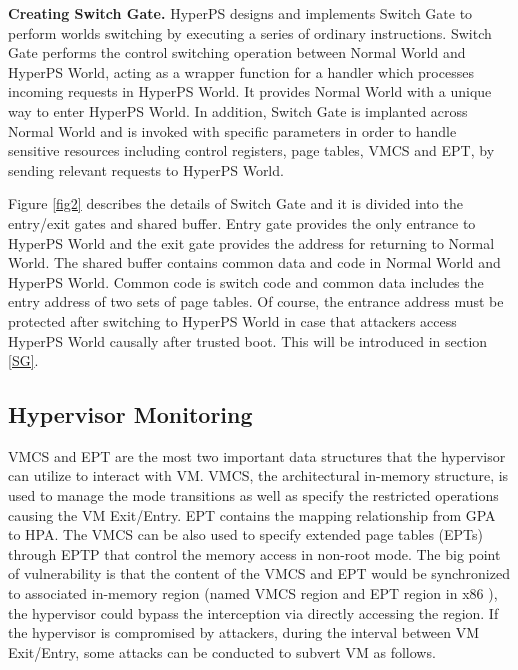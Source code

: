 ﻿\documentclass[conference]{IEEEtran}
\begin{document}
\textbf{Creating Switch Gate.}
HyperPS designs and implements Switch Gate to perform worlds switching by executing a series of ordinary instructions.
Switch Gate performs the control switching operation between Normal World and HyperPS World, acting as a wrapper function for a handler which processes incoming requests in HyperPS World. It provides Normal World with a unique way to enter HyperPS World. In addition, Switch Gate is implanted across Normal World and is invoked with specific parameters in order to handle sensitive resources including control registers, page tables, VMCS and EPT, by sending relevant requests to HyperPS World.

Figure \ref{fig2} describes the details of Switch Gate and it is divided into the entry/exit gates and shared buffer.
Entry gate provides the only entrance to HyperPS World and the exit gate provides the address for returning to Normal World. The shared buffer contains common data and code in Normal World and HyperPS World. Common code is switch code and common data includes the entry address of two sets of page tables.
 Of course, the entrance address must be protected after switching to HyperPS World in case that attackers access HyperPS World causally after trusted boot. This will be introduced in section \ref{SG}.


\subsection{Hypervisor Monitoring}\label {interaction}

 VMCS and EPT are the most two important data structures that the hypervisor can utilize to interact with VM. %
VMCS, the architectural in-memory structure, is used to manage the mode transitions as well as specify the restricted operations causing the VM Exit/Entry. EPT contains the mapping relationship from GPA to HPA. The VMCS can be also used to specify extended page tables (EPTs) through EPTP that control the memory access in non-root mode.
The big point of vulnerability is that the content of the VMCS and EPT would be synchronized to associated in-memory region (named VMCS region and EPT region in x86 ), the hypervisor could bypass the interception via directly accessing the region.
If the hypervisor is compromised by attackers, during the interval between VM Exit/Entry, some attacks can be conducted to subvert VM as follows. 
\end{document}
